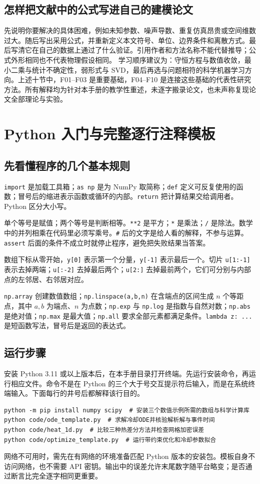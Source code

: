 \documentclass[UTF8,zihao=-4,openany,oneside,fontset=windows]{ctexbook}
\begin{document}
\section{怎样把文献中的公式写进自己的建模论文}
先说明你要解决的具体困难，例如未知参数、噪声导数、重复仿真昂贵或空间维数过大。随后写出采用公式，并重新定义本文符号、单位、边界条件和离散方式。最后写清它在自己的数据上通过了什么验证。引用作者和方法名称不能代替推导；公式外形相同也不代表物理假设相同。
学习顺序建议为：守恒方程与数值收敛，最小二乘与统计不确定性，弱形式与 SVD，最后再选与问题相符的科学机器学习方向。上述十节中，F01--F03 是重要基础，F04--F10 是连接这些基础的代表性研究方法。所有解释均为针对本手册的教学性重述，未逐字搬录论文，也未声称复现论文全部理论与实验。

\chapter{Python 入门与完整逐行注释模板}
\section{先看懂程序的几个基本规则}
\texttt{import} 是加载工具箱；\texttt{as np} 是为 NumPy 取简称；\texttt{def} 定义可反复使用的函数；冒号后的缩进表示函数或循环的内部。\texttt{return} 把计算结果交给调用者。Python 区分大小写。

单个等号是赋值；两个等号是判断相等。\texttt{**2} 是平方；\texttt{*} 是乘法；\texttt{/} 是除法。数学中的并列相乘在代码里必须写乘号。\texttt{\#} 后的文字是给人看的解释，不参与运算。\texttt{assert} 后面的条件不成立时就停止程序，避免把失败结果当答案。

数组下标从零开始，\texttt{y[0]} 表示第一个分量，\texttt{y[-1]} 表示最后一个。切片 \texttt{u[1:-1]} 表示去掉两端；\texttt{u[:-2]} 去掉最后两个；\texttt{u[2:]} 去掉最前两个，它们可分别与内部点的左邻居、右邻居对应。

\texttt{np.array} 创建数值数组；\texttt{np.linspace(a,b,n)} 在含端点的区间生成 $n$ 个等距点，其中 $a,b$ 为端点、$n$ 为点数；\texttt{np.exp} 与 \texttt{np.log} 是指数与自然对数；\texttt{np.abs} 是绝对值；\texttt{np.max} 是最大值；\texttt{np.all} 要求全部元素都满足条件。\texttt{lambda z: ...} 是短函数写法，冒号后是返回的表达式。

\section{运行步骤}
安装 Python 3.11 或以上版本后，在本手册目录打开终端。先运行安装命令，再运行相应文件。命令不是在 Python 的三个大于号交互提示符后输入，而是在系统终端输入。下面每行的井号后都解释该行目的。
\begin{Verbatim}[breaklines=true,breakanywhere=true,fontsize=\small]
python -m pip install numpy scipy  # 安装三个数值示例所需的数组与科学计算库
python code/ode_template.py  # 求解冷却ODE并核验解析解与事件时间
python code/heat_1d.py  # 比较三种热差分方法并检查网格加密误差
python code/optimize_template.py  # 运行带约束优化和冷却参数拟合
\end{Verbatim}
网络不可用时，需先在有网络的环境准备匹配 Python 版本的安装包。模板自身不访问网络，也不需要 API 密钥。输出中的误差允许末尾数字随平台略变；是否通过断言比完全逐字相同更重要。
\end{document}
